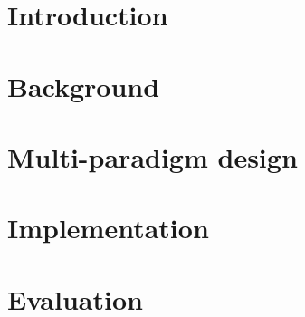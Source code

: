 \documentclass{article}
\begin{document}

\clearpage

\tableofcontents
\clearpage

\section{Introduction}
\label{sec:intro}


\section{Background}
\label{sec:background}



\section{Multi-paradigm design}
\label{sec:design}





\section{Implementation}
\label{sec:implementation}







\section{Evaluation}
\end{document}

